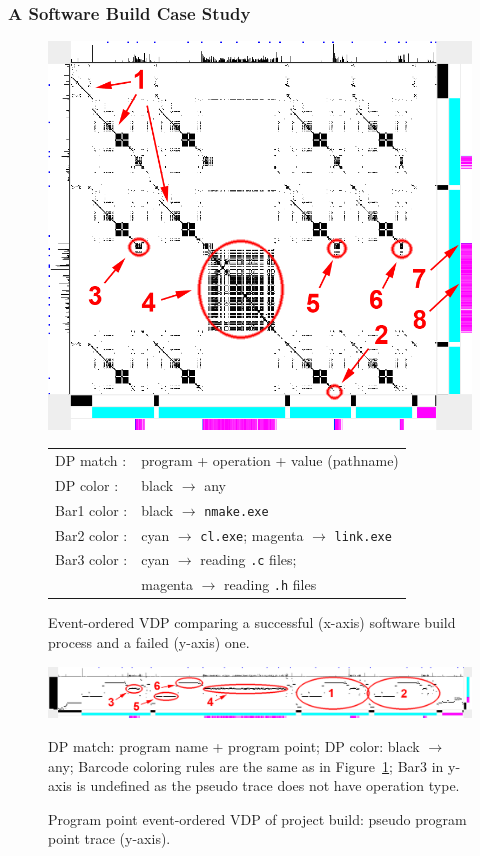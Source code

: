 \subsubsection{A Software Build Case Study}
\label{sec:build}

\begin{figure}[htbp]
\begin{center}
\includegraphics[width=0.8\columnwidth]{lviz/make-fail.png}
\caption{Event-ordered VDP comparing a successful (x-axis)
software build process and a failed (y-axis) one.
\label{fig:make-fail}
}
\begin{tabular}{ll}
DP match : & program + operation + value (pathname)\\
DP color : & black $\rightarrow$ any\\
Bar1 color : & black $\rightarrow$ {\tt nmake.exe}\\
Bar2 color : & cyan $\rightarrow$ {\tt cl.exe}; magenta $\rightarrow$ {\tt link.exe}\\
Bar3 color : & cyan $\rightarrow$ reading {\tt .c} files;\\
 & magenta $\rightarrow$ reading {\tt .h} files
\end{tabular}
\end{center}
\end{figure}

\begin{figure}[htb]
\includegraphics[width=1.0\textwidth]{lviz/make-pp.png}
\caption{Program point event-ordered VDP of project build: pseudo program point trace (y-axis).}
DP match: program name + program point;
DP color: black $\rightarrow$ any;
Barcode coloring rules are the same as in Figure~\ref{fig:make-fail};
Bar3 in y-axis is undefined as the pseudo trace does not have operation type.
\label{fig:make-pp}
\end{figure}

